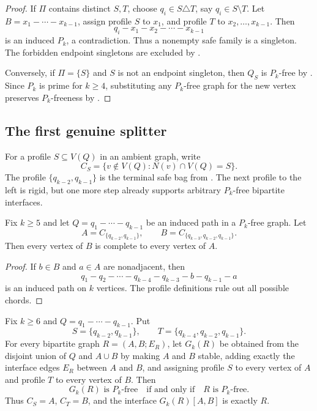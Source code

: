 \begin{proof}
If $\Pi$ contains distinct $S,T$, choose $q_i\in S\triangle T$, say $q_i\in S\setminus T$. Let $B=x_1-\cdots-x_{k-1}$, assign profile $S$ to $x_1$, and profile $T$ to $x_2,\dots,x_{k-1}$. Then
\[
  q_i-x_1-x_2-\cdots-x_{k-1}
\]
is an induced $P_k$, a contradiction. Thus a nonempty safe family is a singleton. The forbidden endpoint singletons are excluded by .

Conversely, if $\Pi=\{S\}$ and $S$ is not an endpoint singleton, then $Q_S$ is $P_k$-free by . Since $P_k$ is prime for $k\ge 4$, substituting any $P_k$-free graph for the new vertex preserves $P_k$-freeness by .
\end{proof}

\subsection{The first genuine splitter}

For a profile $S\subseteq V(Q)$ in an ambient graph, write
\[
  C_S=\{v\notin V(Q):N(v)\cap V(Q)=S\}.
\]
The profile $\{q_{k-2},q_{k-1}\}$ is the terminal safe bag from . The next profile to the left is rigid, but one more step already supports arbitrary $P_k$-free bipartite interfaces.

\begin{proposition}\label{prop:terminal-rigid}
Fix $k\ge 5$ and let $Q=q_1-\cdots-q_{k-1}$ be an induced path in a $P_k$-free graph. Let
\[
  A=C_{\{q_{k-2},q_{k-1}\}},\qquad B=C_{\{q_{k-3},q_{k-2},q_{k-1}\}}.
\]
Then every vertex of $B$ is complete to every vertex of $A$.
\end{proposition}

\begin{proof}
If $b\in B$ and $a\in A$ are nonadjacent, then
\[
  q_1-q_2-\cdots-q_{k-4}-q_{k-3}-b-q_{k-1}-a
\]
is an induced path on $k$ vertices. The profile definitions rule out all possible chords.
\end{proof}

\begin{theorem}\label{thm:first-splitter}
Fix $k\ge 6$ and $Q=q_1-\cdots-q_{k-1}$. Put
\[
  S=\{q_{k-2},q_{k-1}\},\qquad T=\{q_{k-4},q_{k-2},q_{k-1}\}.
\]
For every bipartite graph $R=(A,B;E_R)$, let $G_k(R)$ be obtained from the disjoint union of $Q$ and $A\cup B$ by making $A$ and $B$ stable, adding exactly the interface edges $E_R$ between $A$ and $B$, and assigning profile $S$ to every vertex of $A$ and profile $T$ to every vertex of $B$. Then
\[
  G_k(R)\text{ is }P_k\text{-free}\quad\text{if and only if}\quad R\text{ is }P_k\text{-free}.
\]
Thus $C_S=A$, $C_T=B$, and the interface $G_k(R)[A,B]$ is exactly $R$.
\end{theorem}


